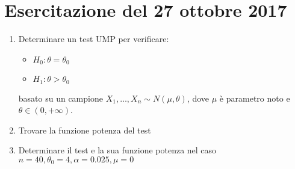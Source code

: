 \documentclass[hidelinks, 10pt]{report}
\begin{document}
\section{Esercitazione del 27 ottobre 2017}
\begin{ex}
\noindent
\begin{enumerate}
\item Determinare un test UMP per verificare:
\begin{itemize}
\item $ H_{0}: \theta = \theta_{0} $
\item $ H_{1}: \theta > \theta_{0} $
\end{itemize}

basato su un campione $ X_{1}, \dotsc, X_{n} \sim N(\mu, \theta) $, dove $ \mu $ \`e parametro noto e $ \theta \in (0, +\infty) $.
\item Trovare la funzione potenza del test
\item Determinare il test e la sua funzione potenza nel caso $ n = 40, \theta_{0} = 4, \alpha = 0.025, \mu = 0 $
\end{enumerate}
\end{ex}
\end{document}
